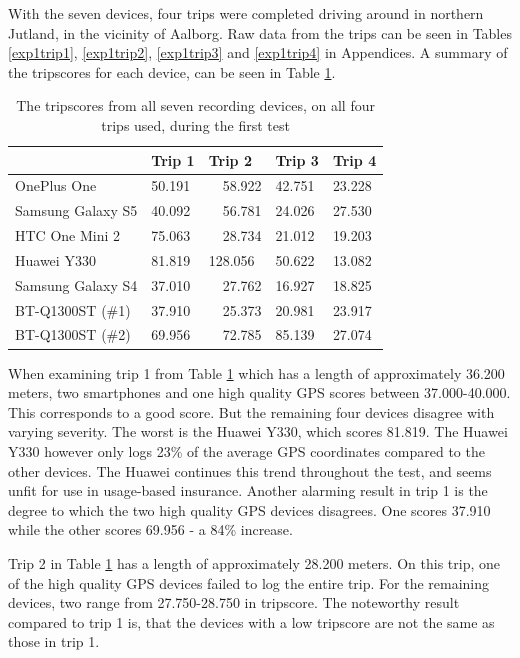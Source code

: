 With the seven devices, four trips were completed driving around in northern Jutland, in the vicinity of Aalborg. Raw data from the trips can be seen in Tables \ref{exp1trip1}, \ref{exp1trip2}, \ref{exp1trip3} and \ref{exp1trip4} in Appendices. A summary of the tripscores for each device, can be seen in Table \ref{tab:smartphone_test_one}.

\begin{table}[tb]
\centering
\caption{The tripscores from all seven recording devices, on all four trips used, during the first test}
\label{tab:smartphone_test_one}
\begin{tabular}{|l|llll|}
\hline
\rowcolor{tablegreen}

                   & \textbf{Trip 1}    & \textbf{Trip 2}    & \textbf{Trip 3}    & \textbf{Trip 4}  \\\hline
OnePlus One        & 50.191   & \ \  58.922   & 42.751   & 23.228 \\
Samsung Galaxy S5  & 40.092   & \ \ 56.781   & 24.026   & 27.530 \\
HTC One Mini 2     & 75.063   & \ \ 28.734   & 21.012   & 19.203 \\
Huawei Y330        & 81.819   &  128.056   & 50.622   & 13.082 \\
Samsung Galaxy S4  & 37.010   & \ \ 27.762   & 16.927   & 18.825 \\
BT-Q1300ST (\#1)   & 37.910   & \ \ 25.373   & 20.981   & 23.917 \\
BT-Q1300ST (\#2)   & 69.956   & \ \ 72.785   & 85.139   & 27.074 \\\hline

\end{tabular}
\end{table}

When examining trip 1 from Table \ref{tab:smartphone_test_one} which has a length of approximately 36.200 meters, two smartphones and one high quality GPS scores between 37.000-40.000. This corresponds to a good score. But the remaining four devices disagree with varying severity. The worst is the Huawei Y330, which scores 81.819. The Huawei Y330 however only logs 23\% of the average GPS coordinates compared to the other devices. The Huawei continues this trend throughout the test, and seems unfit for use in usage-based insurance. Another alarming result in trip 1 is the degree to which the two high quality GPS devices disagrees. One scores 37.910 while the other scores 69.956 - a 84\% increase.

Trip 2 in Table \ref{tab:smartphone_test_one} has a length of approximately 28.200 meters. On this trip, one of the high quality GPS devices failed to log the entire trip. For the remaining devices, two  range from 27.750-28.750 in tripscore. The noteworthy result compared to trip 1 is, that the devices with a low tripscore are not the same as those in trip 1.

